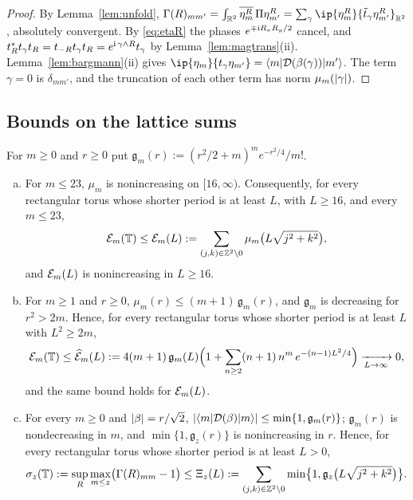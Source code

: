 \begin{proof}
By Lemma~\ref{lem:unfold}, $\Gamma(R)_{mm'}=\int_{\R^2}\overline{\eta_m^R}\,\Pk\eta_{m'}^R=\sum_\gamma\ip{\eta_m^R}{\tl_\gamma\eta_{m'}^R}_{\R^2}$, absolutely
convergent. By \eqref{eq:etaR} the phases $e^{\mp\mathrm{i} R_xR_y/2}$ cancel, and
$t_R^*t_\gamma t_R=t_{-R}t_\gamma t_R=e^{\mathrm{i}\,\gamma\wedge R}t_\gamma$ by Lemma~\ref{lem:magtrans}(ii). Lemma~\ref{lem:bargmann}(ii)
gives $\ip{\eta_m}{t_\gamma\eta_{m'}}=\bra m\Dis(\beta(\gamma))\ket{m'}$. The term $\gamma=0$ is $\delta_{mm'}$, and the
truncation of each other term has norm $\mu_m(\lvert\gamma\rvert)$.
\end{proof}

\subsection{Bounds on the lattice sums}

\begin{lemma}\label{lem:Ebounds}
For $m\ge0$ and $r\ge0$ put $\mathfrak g_m(r):=(r^2/2+m)^me^{-r^2/4}/m!$.
\begin{enumerate}[(a)]
\item For $m\le23$, $\mu_m$ is nonincreasing on $[16,\infty)$. Consequently, for every rectangular torus whose shorter period
is at least $L$, with $L\ge16$, and every $m\le23$,
\[
\mathcal{E}_m(\mathbb{T})\le\mathcal{E}_m(L):=\sum_{(j,k)\in\mathbb{Z}^2\setminus0}\mu_m\bigl(L\sqrt{j^2+k^2}\bigr),
\]
and $\mathcal{E}_m(L)$ is nonincreasing in $L\ge16$.
\item For $m\ge1$ and $r\ge0$, $\mu_m(r)\le(m+1)\,\mathfrak g_m(r)$, and $\mathfrak g_m$ is decreasing
for $r^2>2m$. Hence, for every rectangular torus whose shorter period is at least $L$ with $L^2\ge2m$,
\[
\mathcal{E}_m(\mathbb{T})\le\widehat{\mathcal{E}}_m(L):=4(m+1)\,\mathfrak g_m(L)\Bigl(1+\sum_{n\ge2}(n+1)\,n^m\,e^{-(n-1)L^2/4}\Bigr)\xrightarrow[L\to\infty]{}0 ,
\]
and the same bound holds for $\mathcal{E}_m(L)$.
\item For every $m\ge0$ and $\lvert\beta\rvert=r/\sqrt2$, $\lvert\langle m\rvert\mathcal{D}(\beta)\lvert m\rangle\rvert\le\min\{1,\mathfrak g_m(r)\}$;
$\mathfrak g_m(r)$ is nondecreasing in $m$, and $\min\{1,\mathfrak g_z(r)\}$ is
nonincreasing in $r$. Hence, for every rectangular torus whose shorter period is at least $L>0$,
\[
\sigma_z(\mathbb{T}):=\sup_R\max_{m\le z}\bigl(\Gamma(R)_{mm}-1\bigr)\le\Xi_z(L):=\sum_{(j,k)\in\mathbb{Z}^2\setminus0}\min\bigl\{1,\mathfrak g_z\bigl(L\sqrt{j^2+k^2}\bigr)\bigr\}.
\]
\end{enumerate}
\end{lemma}

